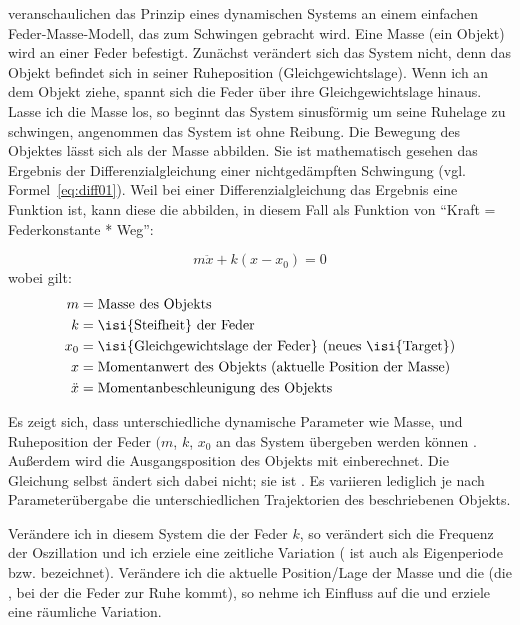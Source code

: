\citet{Browman1986} veranschaulichen das Prinzip eines dynamischen Systems an einem einfachen Feder-Masse-Modell, das zum Schwingen gebracht wird. Eine Masse (ein Objekt) wird an einer Feder befestigt. Zunächst verändert sich das System nicht, denn das Objekt befindet sich in seiner Ruheposition (Gleichgewichtslage). Wenn ich an dem Objekt ziehe, spannt sich die Feder über ihre Gleichgewichtslage hinaus. Lasse ich die Masse los, so beginnt das System sinusförmig um seine Ruhelage zu schwingen, angenommen das System ist ohne Reibung. Die Bewegung des Objektes lässt sich als  der Masse abbilden. Sie ist mathematisch gesehen das Ergebnis der Differenzialgleichung einer nichtgedämpften Schwingung (vgl. Formel~\ref{eq:diff01}). Weil bei einer Differenzialgleichung das Ergebnis eine Funktion ist, kann diese die  abbilden, in diesem Fall als Funktion von \enquote{Kraft = Federkonstante * Weg}:

\begin{equation}
\label{eq:diff01}
m\ddot{x}+k\left(x-x_{0}\right)=0
\end{equation}
wobei gilt:
\begin{align*}
m = & \; \text{Masse des Objekts} \\%
k = & \; \text{\isi{Steifheit} der Feder} \\%
x_{0} = & \; \text{\isi{Gleichgewichtslage der Feder} (neues \isi{Target})}\\%
x = & \; \text{Momentanwert des Objekts (aktuelle Position der Masse)} \\%
\ddot{x} = & \; \text{Momentanbeschleunigung des Objekts}\\%
\end{align*}

Es zeigt sich, dass unterschiedliche dynamische Parameter wie Masse,  und Ruheposition der Feder $(m$,  $k$,  ${x}_{0}$ an das System übergeben werden können \citep{Browman1986}. Außerdem wird die Ausgangsposition des Objekts mit einberechnet. Die Gleichung selbst ändert sich dabei nicht; sie ist . Es variieren lediglich je nach Parameterübergabe die unterschiedlichen Trajektorien des beschriebenen Objekts.

Verändere ich in diesem System die  der Feder $k$, so verändert sich die Frequenz der Oszillation und ich erziele eine zeitliche Variation ( ist auch als Eigenperiode bzw.  bezeichnet). Verändere ich die aktuelle Position/Lage der Masse und die  (die , bei der die Feder zur Ruhe kommt), so nehme ich Einfluss auf die  und erziele eine räumliche Variation.

